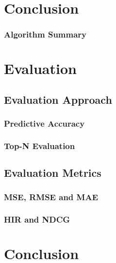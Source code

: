 \section{Conclusion}
\label{sec:Conclusion}








\subsubsection{Algorithm Summary}
\label{subsubsec:Algorithm Summary}

\section{Evaluation}
\label{sec:Evaluation}

\subsection{Evaluation Approach}
\label{subsec:Evaluation Approach}

\subsubsection{Predictive Accuracy}
\label{subsubsec:Predictive Accuracy}

\subsubsection{Top-N Evaluation}
\label{subsubsec:Top-N Evaluation}

\subsection{Evaluation Metrics}
\label{subsec:Evaluation Metrics}

\subsubsection{MSE, RMSE and MAE}
\label{subsubsec:MSE, RMSE and MAE}

\subsubsection{HIR and NDCG}
\label{subsubsec:HIR and NDCG}

\section{Conclusion}
\label{sec:Conclusion}



